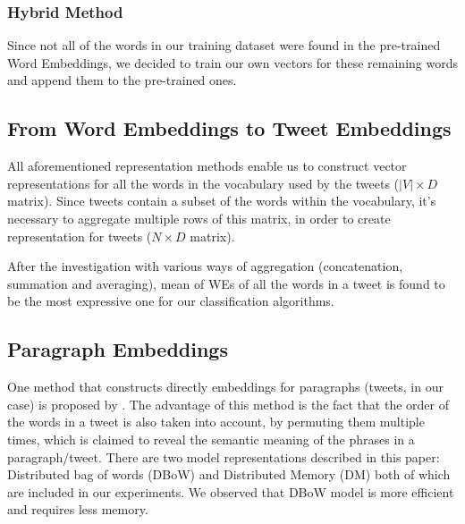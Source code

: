 \subsubsection{Hybrid Method}
Since not all of the words in our training dataset were found in the pre-trained Word Embeddings, we decided to train our own vectors for these remaining words and append them to the pre-trained ones.


\subsection{From Word Embeddings to Tweet Embeddings}
All aforementioned representation methods enable us to construct vector representations for all the words in the vocabulary used by the tweets ($|V| \times D$ matrix).
Since tweets contain a subset of the words within the vocabulary, it's necessary to aggregate multiple rows of this matrix, in order to create representation for tweets ($N \times D$ matrix).

After the investigation with various ways of aggregation (concatenation, summation and averaging), mean of WEs of all the words in a tweet is found to be the most expressive one for our classification algorithms.


\subsection{Paragraph Embeddings}
One method that constructs directly embeddings for paragraphs (tweets, in our case) is proposed by \cite{le2014distributed}.
The advantage of this method is the fact that the order of the words in a tweet is also taken into account, by permuting them multiple times, which is claimed to reveal the semantic meaning of the phrases in a paragraph/tweet.
There are two model representations described in this paper: Distributed bag of words (DBoW) and Distributed Memory (DM) both of which are included in our experiments.
We observed that DBoW model is more efficient and requires less memory.
